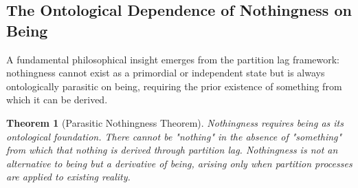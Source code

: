 \documentclass[12pt,a4paper]{article}
\newtheorem{theorem}{Theorem}[section]
\theoremstyle{definition}
\theoremstyle{remark}
\begin{document}
\subsection{The Ontological Dependence of Nothingness on Being}

A fundamental philosophical insight emerges from the partition lag framework: nothingness cannot exist as a primordial or independent state but is always ontologically parasitic on being, requiring the prior existence of something from which it can be derived.

\begin{theorem}[Parasitic Nothingness Theorem]
\label{thm:parasitic_nothingness}
Nothingness requires being as its ontological foundation. There cannot be "nothing" in the absence of "something" from which that nothing is derived through partition lag. Nothingness is not an alternative to being but a derivative of being, arising only when partition processes are applied to existing reality.
\end{theorem}
\end{document}
